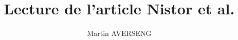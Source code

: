 \documentclass[11pt,a4paper]{article}
\author{Martin AVERSENG}
\title{Lecture de l'article Nistor et al.}
\begin{document}
\maketitle	



\begin{Lem} 
\end{Lem}
\end{document}
